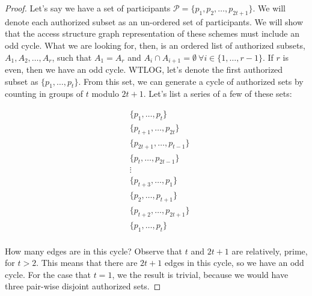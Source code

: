 \begin{proof}
    Let's say we have a set of participants $\mathcal{P} = \{p_1,p_2,\dots,p_{2t+1}\}$. We will denote each authorized subset as an un-ordered set of participants. We will show that the access structure graph representation of these schemes must include an odd cycle. What we are looking for, then, is an ordered list of authorized subsets, $A_1, A_2, \dots, A_r$, such that $A_1=A_r$ and $A_i \cap A_{i+1} = \emptyset \: \forall i \in \{1,\dots,r-1\}$. If $r$ is even, then we have an odd cycle. WTLOG, let's denote the first authorized subset as $\{p_1,\dots,p_{t}\}$. From this set, we can generate a cycle of authorized sets by counting in groups of $t$ modulo $2t+1$. Let's list a series of a few of these sets:
    
    \begin{align*}
        &\{p_1,\dots,p_{t}\} \\ 
        &\{p_{t+1},\dots,p_{2t}\} \\ 
        &\{p_{2t+1},\dots,p_{t-1}\} \\ 
        &\{p_{t},\dots,p_{2t-1}\} \\
        & \vdots \\
        &\{p_{t+3},\dots,p_{1}\} \\ 
        &\{p_{2},\dots,p_{t+1}\} \\ 
        &\{p_{t+2},\dots,p_{2t+1}\} \\ 
        &\{p_1,\dots,p_{t}\} \\ 
    \end{align*}
    
    How many edges are in this cycle? Observe that $t$ and $2t+1$ are relatively, prime, for $t > 2$. This means that there are $2t+1$ edges in this cycle, so we have an odd cycle. For the case that $t=1$, we the result is trivial, because we would have three pair-wise disjoint authorized sets.
\end{proof}






